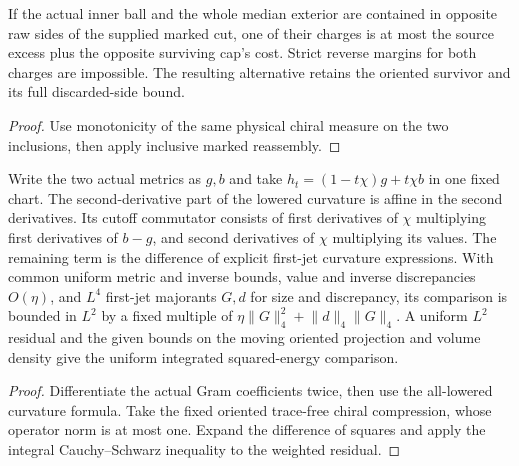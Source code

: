 \begin{corollary}
\label{cor:ed03-charged-cut}
\leanok
If the actual inner ball and the whole median exterior are contained
in opposite raw sides of the supplied marked cut, one of their charges
is at most the source excess plus the opposite surviving cap's cost.
Strict reverse margins for both charges are impossible. The resulting
alternative retains the oriented survivor and its full discarded-side bound.
\end{corollary}
\begin{proof}
\leanok
Use monotonicity of the same physical chiral measure on the two
inclusions, then apply inclusive marked reassembly.
\end{proof}

\begin{lemma}
\label{lem:ed03-splice-curvature}
\leanok
Write the two actual metrics as \(g,b\) and take
\(h_t=(1-t\chi)g+t\chi b\) in one fixed chart.
The second-derivative part of the lowered curvature is affine in the
second derivatives. Its cutoff commutator consists of first derivatives
of \(\chi\) multiplying first derivatives of \(b-g\), and second
derivatives of \(\chi\) multiplying its values. The remaining term is
the difference of explicit first-jet curvature expressions. With common
uniform metric and inverse bounds, value and inverse discrepancies
\(O(\eta)\), and \(L^4\) first-jet majorants \(G,d\) for size and discrepancy,
its comparison is bounded in \(L^2\) by a fixed multiple of
\(\eta\lVert G\rVert_4^2+\lVert d\rVert_4\lVert G\rVert_4\). A uniform
\(L^2\) residual and the given bounds on the moving oriented projection
and volume density give the uniform integrated squared-energy comparison.
\end{lemma}
\begin{proof}
\leanok
Differentiate the actual Gram coefficients twice, then use the
all-lowered curvature formula. Take the fixed oriented trace-free chiral
compression, whose operator norm is at most one. Expand the difference
of squares and apply the integral Cauchy--Schwarz inequality to the
weighted residual.
\end{proof}


